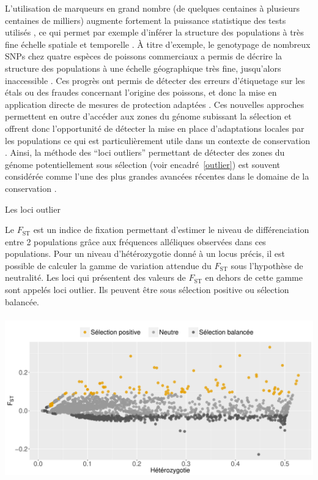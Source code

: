 \documentclass[a4paper,12pt,twoside]{article}\usepackage[]{graphicx}\usepackage[]{color}
\begin{document}
\begin {bibunit} [newbst]
L'utilisation de marqueurs en grand nombre (de quelques centaines à plusieurs centaines de milliers) augmente fortement la puissance statistique des tests utilisés \citep{waples1998separating, gagnaire2015aa}, ce qui permet par exemple d'inférer la structure des populations à très fine échelle spatiale et temporelle \citep{szulkin2016population, mccormack2013next}. À titre d'exemple, le genotypage de nombreux SNPs chez quatre espèces de poissons commerciaux a permis de décrire la structure des populations à une échelle géographique très fine, jusqu'alors inaccessible \citep{martinsohn2009fishpoptrace, shafer2015genomics}. Ces progrès ont permis de détecter des erreurs d'étiquetage sur les étals ou des fraudes concernant l'origine des poissons, et donc la mise en application directe de mesures de protection adaptées \citep{martinsohn2009fishpoptrace}.
Ces nouvelles approches permettent en outre d'accéder aux zones du génome subissant la sélection et offrent donc l'opportunité de détecter la mise en place d'adaptations locales par les populations \citep{stapley2010adaptation} ce qui est par\-ti\-cu\-lière\-ment utile dans un contexte de conservation \citep{steiner2013conservation}. Ainsi, la méthode des ``loci outliers'' permettant de détecter des zones du génome potentiellement sous sélection (voir encadré~\ref{outlier}) est souvent considérée comme l'une des plus grandes avancées récentes dans le domaine de la conservation \citep{funk2012harnessing, mcmahon2014and, shafer2015genomics}.

\begin{enca}
	\caption{Les loci outlier}\label{outlier}
    Le $F_\text{ST}$ est un indice de fixation permettant d'estimer le niveau de différenciation entre 2 populations grâce aux fréquences alléliques observées dans ces populations. Pour un niveau d'hétérozygotie donné à un locus précis, il est possible de calculer la gamme de variation attendue du $F_\text{ST}$ sous l'hypothèse de neutralité. Les loci qui présentent des valeurs de $F_\text{ST}$ en dehors de cette gamme sont appelés loci outlier. Ils peuvent être sous sélection positive ou sélection balancée.


{\centering \includegraphics[width=14cm,height=7cm]{figure/lositan-1} 

}
\end{enca}
\end{bibunit}
\end{document}
